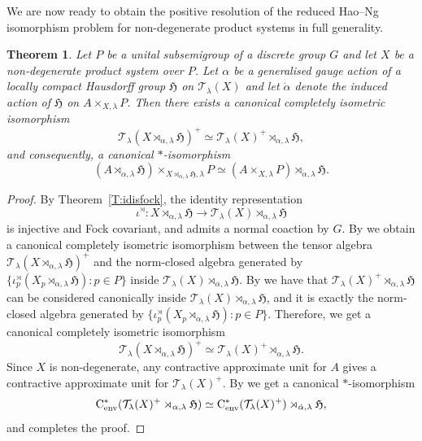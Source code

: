 \documentclass[11pt,final]{amsart}
\numberwithin{equation}{section}
\theoremstyle{plain}
\newtheorem{theorem}{Theorem}[section]
\theoremstyle{definition}
\theoremstyle{remark}
\newcommand{\T}{{\mathcal{T}}}
\def\al{\alpha}
\def\io{\iota}
\def\la{\lambda}
\newcommand{\fH}{{\mathfrak{H}}}
\newcommand{\cenv}{\mathrm{C}^*_{\textup{env}}}
\begin{document}
We are now ready to obtain the positive resolution of the reduced Hao--Ng isomorphism problem for non-degenerate product systems in full generality.

\begin{theorem}\label{T:HaoNg}
Let $P$ be a unital subsemigroup of a discrete group $G$ and let $X$ be a non-degenerate product system over $P$.
Let $\al$ be a generalised gauge action of a locally compact Hausdorff group $\fH$ on $\T_\la(X)$ and let $\dot{\al}$ denote the induced action of $\fH$ on $A \times_{X,\la} P$.
Then there exists a canonical completely isometric isomorphism
\[
\T_\la(X \rtimes_{\al, \la} \fH)^+ \simeq \T_\la(X)^+ \rtimes_{\al, \la} \fH,
\]
and consequently, a canonical $*$-isomorphism
\[
(A \rtimes_{\al, \la} \fH) \times_{X \rtimes_{\al, \la} \fH,\la} P
\simeq
(A \times_{X, \la} P) \rtimes_{\dot \al, \la} \fH.
\]
\end{theorem}

\begin{proof}
By Theorem~\ref{T:idisfock}, the identity representation
\[
\io^\rtimes:X\rtimes_{\al,\la}\fH
\to \T_\la(X)\rtimes_{\al,\la}\fH
\]
is injective and Fock covariant, and admits a normal coaction by $G$.
By \cite[Corollary 4.1]{KP25} we obtain a canonical completely isometric isomorphism between the tensor algebra $\T_\la(X\rtimes_{\al,\la}\fH)^+$ and the norm-closed algebra generated by $\{\io^\rtimes_p(X_p\rtimes_{\al,\la}\fH):p\in P\}$ inside $\T_\la(X)\rtimes_{\al,\la}\fH$. By \cite[Corollary 3.16]{KR19} we have that $\T_\la(X)^+ \rtimes_{\al, \la} \fH$ can be considered canonically inside $\T_\la(X) \rtimes_{\al, \la} \fH$, and it is exactly the norm-closed algebra generated by $\{\io^\rtimes_p(X_p\rtimes_{\al,\la}\fH):p\in P\}$. Therefore, we get a canonical completely isometric isomorphism
\[
\T_\la(X\rtimes_{\al,\la}\fH)^+
\simeq
\T_\la(X)^+ \rtimes_{\al, \la} \fH.
\]
Since $X$ is non-degenerate, any contractive approximate unit for $A$ gives a 
contractive approximate unit for $\T_\la(X)^+$.
By \cite[Theorem~4.4]{DT26} we get a canonical
$*$-isomorphism
\[
\cenv(\T_\la(X)^+\rtimes_{\al,\la}\fH)
\simeq
\cenv(\T_\la(X)^+)\rtimes_{\dot\al,\la}\fH,
\]
and \cite[Theorem~5.1]{Seh22} completes the proof.
\end{proof}
\end{document}
